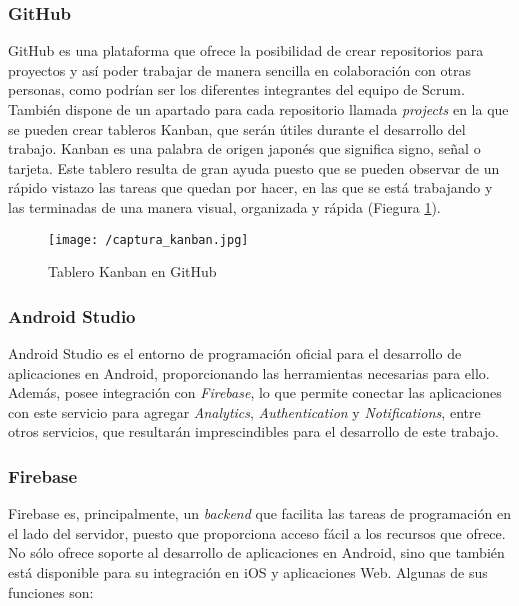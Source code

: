 \subsubsection*{GitHub}
GitHub es una plataforma que ofrece la posibilidad de crear repositorios para proyectos y así poder trabajar de manera sencilla en colaboración con otras personas, como podrían ser los diferentes integrantes del equipo de Scrum. También dispone de un apartado para cada repositorio llamada \textit{projects} en la que se pueden crear tableros Kanban, que serán útiles durante el desarrollo del trabajo. Kanban \cite{Gomez2017} es una palabra de origen japonés que significa signo, señal o tarjeta. Este tablero resulta de gran ayuda puesto que se pueden observar de un rápido vistazo las tareas que quedan por hacer, en las que se está trabajando y las terminadas de una manera visual, organizada y rápida (Fiegura \ref{fig:kanban}).

\begin{figure}[!h]
	\begin{center}
		\texttt{[image: /captura\_kanban.jpg]}
		\caption{Tablero Kanban en GitHub}
		\label{fig:kanban}
	\end{center}
\end{figure}

\subsubsection*{Android Studio}
Android Studio \cite{AndroidStudio} es el entorno de programación oficial para el desarrollo de aplicaciones en Android, proporcionando las herramientas necesarias para ello. Además, posee integración con \textit{Firebase}, lo que permite conectar las aplicaciones con este servicio para agregar \textit{Analytics}, \textit{Authentication} y \textit{Notifications}, entre otros servicios, que resultarán imprescindibles para el desarrollo de este trabajo.

\newpage

\subsubsection*{Firebase}
Firebase \cite{GooFirebase} es, principalmente, un \textit{backend} que facilita las tareas de programación en el lado del servidor, puesto que proporciona acceso fácil a los recursos que ofrece. No sólo ofrece soporte al desarrollo de aplicaciones en Android, sino que también está disponible para su integración en iOS y aplicaciones Web. Algunas de sus funciones son:

